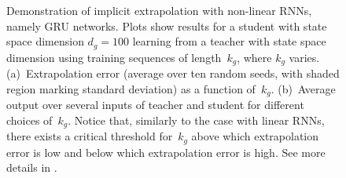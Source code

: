 \begin{figure}
\centering
{}
\caption{
Demonstration of implicit extrapolation with non-linear RNNs, namely GRU networks.
Plots show results for a student with state space dimension $d_g = 100$ learning from a teacher with state space dimension  using training sequences of length~$k_g$, where $k_g$ varies.
(a)~Extrapolation error (average over ten random seeds, with shaded region marking standard deviation) as a function of~$k_g$.
(b)~Average output over several inputs of teacher and student for different choices of~$k_g$.
Notice that, similarly to the case with linear RNNs, there exists a critical threshold for~$k_g$ above which extrapolation error is low and below which extrapolation error is high.
See more details  in .
}
\label{fig:gru_extrapolation}
\end{figure}